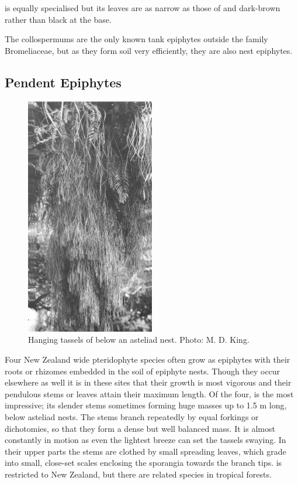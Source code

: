  is equally specialised but its leaves are as narrow as those of  and dark-brown rather than black at the base.

The collospermums are the only known tank epiphytes outside the family Bromeliaceae, but as they form soil very efficiently, they are also nest epiphytes.

\subsection{Pendent Epiphytes}

\begin{figure}
	\includegraphics[width=0.5\textwidth]{graphics/figure42lycopodium.jpg}
	\centering
	\caption[Hanging tassels of Lycopodium varium]{Hanging tassels of  below an asteliad nest.
	Photo: M. D. King.}%
	\label{fig:42lycopodium}
\end{figure}

Four New Zealand wide pteridophyte species often grow as epiphytes with their roots or rhizomes embedded in the soil of epiphyte nests.
Though they occur elsewhere as well it is in these sites that their growth is most vigorous and their pendulous stems or leaves attain their maximum length.
Of the four,  is the most impressive; its slender stems sometimes forming huge masses up to 1.5 m long, below asteliad nests.
The stems branch repeatedly by equal forkings or dichotomies, so that they form a dense but well balanced mass.
It is almost constantly in motion as even the lightest breeze can set the tassels swaying.
In their upper parts the stems are clothed by small spreading leaves, which grade into small, close-set scales enclosing the sporangia towards the branch tips.  is restricted to New Zealand, but there are related species in tropical forests.

